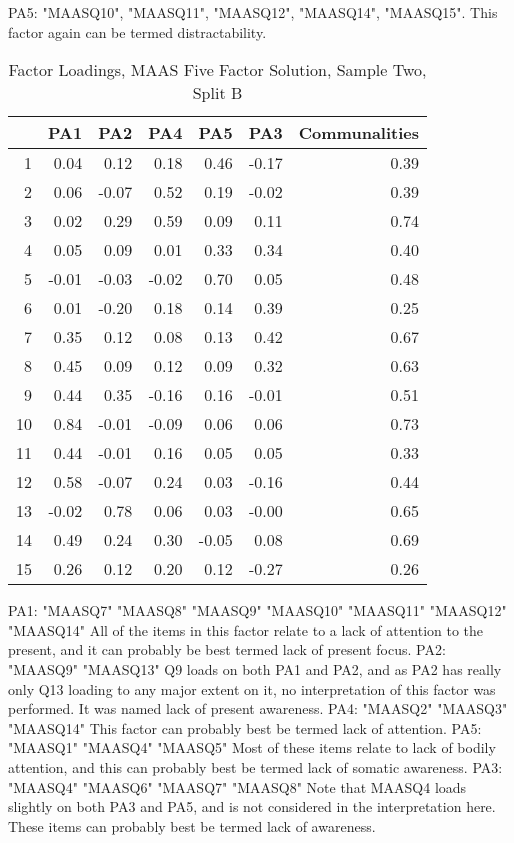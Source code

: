 \documentclass{article}
\begin{document}
PA5: "MAASQ10", "MAASQ11", "MAASQ12", "MAASQ14", "MAASQ15".  This factor again can be termed distractability.

\begin{table}[ht]
\centering
\begin{tabular}{rrrrrrr}
  \hline
 & PA1 & PA2 & PA4 & PA5 & PA3 & Communalities \\ 
  \hline
1 & 0.04 & 0.12 & 0.18 & 0.46 & -0.17 & 0.39 \\ 
  2 & 0.06 & -0.07 & 0.52 & 0.19 & -0.02 & 0.39 \\ 
  3 & 0.02 & 0.29 & 0.59 & 0.09 & 0.11 & 0.74 \\ 
  4 & 0.05 & 0.09 & 0.01 & 0.33 & 0.34 & 0.40 \\ 
  5 & -0.01 & -0.03 & -0.02 & 0.70 & 0.05 & 0.48 \\ 
  6 & 0.01 & -0.20 & 0.18 & 0.14 & 0.39 & 0.25 \\ 
  7 & 0.35 & 0.12 & 0.08 & 0.13 & 0.42 & 0.67 \\ 
  8 & 0.45 & 0.09 & 0.12 & 0.09 & 0.32 & 0.63 \\ 
  9 & 0.44 & 0.35 & -0.16 & 0.16 & -0.01 & 0.51 \\ 
  10 & 0.84 & -0.01 & -0.09 & 0.06 & 0.06 & 0.73 \\ 
  11 & 0.44 & -0.01 & 0.16 & 0.05 & 0.05 & 0.33 \\ 
  12 & 0.58 & -0.07 & 0.24 & 0.03 & -0.16 & 0.44 \\ 
  13 & -0.02 & 0.78 & 0.06 & 0.03 & -0.00 & 0.65 \\ 
  14 & 0.49 & 0.24 & 0.30 & -0.05 & 0.08 & 0.69 \\ 
  15 & 0.26 & 0.12 & 0.20 & 0.12 & -0.27 & 0.26 \\ 
   \hline
\end{tabular}
\caption{Factor Loadings, MAAS Five Factor Solution, Sample Two, Split B} 
\label{tab:tcq2cmaasfact5}
\end{table}
PA1: "MAASQ7"  "MAASQ8"  "MAASQ9"  "MAASQ10" "MAASQ11" "MAASQ12" "MAASQ14"
All of the items in this factor relate to a lack of attention to the present, and it can probably be best termed lack of present focus. 
PA2: "MAASQ9"  "MAASQ13"
Q9 loads on both PA1 and PA2, and as PA2 has really only Q13 loading to any major extent on it, no interpretation of this factor was performed. It was named lack of present awareness. 
PA4: "MAASQ2"  "MAASQ3"  "MAASQ14"
This factor can probably best be termed lack of attention. 
PA5: "MAASQ1" "MAASQ4" "MAASQ5"
Most of these items relate to lack of bodily attention, and this can probably best be termed lack of somatic awareness. 
PA3: "MAASQ4" "MAASQ6" "MAASQ7" "MAASQ8"
Note that MAASQ4 loads slightly on both PA3 and PA5, and is not considered in the interpretation here. These items can probably best be termed lack of awareness. 
\end{document}
